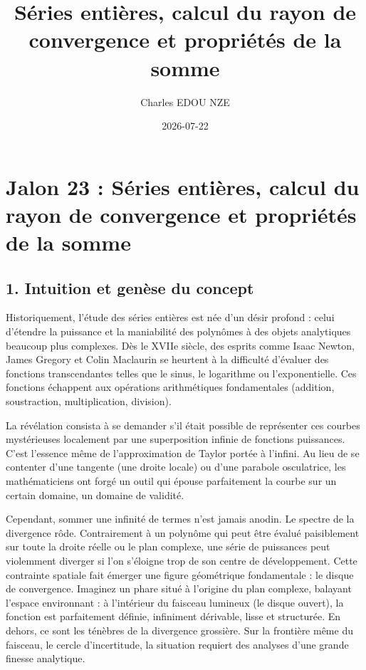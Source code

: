 \documentclass{report}
\title{Séries entières, calcul du rayon de convergence et propriétés de la somme}
\author{Charles EDOU NZE}
\date{2026-07-22}
\begin{document}
\maketitle
\tableofcontents
\newpage

\chapter*{Jalon 23 : Séries entières, calcul du rayon de convergence et propriétés de la somme}

\section*{1. Intuition et genèse du concept}

Historiquement, l'étude des séries entières est née d'un désir profond : celui d'étendre la puissance et la maniabilité des polynômes à des objets analytiques beaucoup plus complexes. Dès le XVIIe siècle, des esprits comme Isaac Newton, James Gregory et Colin Maclaurin se heurtent à la difficulté d'évaluer des fonctions transcendantes telles que le sinus, le logarithme ou l'exponentielle. Ces fonctions échappent aux opérations arithmétiques fondamentales (addition, soustraction, multiplication, division).

La révélation consista à se demander s'il était possible de représenter ces courbes mystérieuses localement par une superposition infinie de fonctions puissances. C'est l'essence même de l'approximation de Taylor portée à l'infini. Au lieu de se contenter d'une tangente (une droite locale) ou d'une parabole osculatrice, les mathématiciens ont forgé un outil qui épouse parfaitement la courbe sur un certain domaine, un domaine de validité.

Cependant, sommer une infinité de termes n'est jamais anodin. Le spectre de la divergence rôde. Contrairement à un polynôme qui peut être évalué paisiblement sur toute la droite réelle ou le plan complexe, une série de puissances peut violemment diverger si l'on s'éloigne trop de son centre de développement. Cette contrainte spatiale fait émerger une figure géométrique fondamentale : le disque de convergence. Imaginez un phare situé à l'origine du plan complexe, balayant l'espace environnant : à l'intérieur du faisceau lumineux (le disque ouvert), la fonction est parfaitement définie, infiniment dérivable, lisse et structurée. En dehors, ce sont les ténèbres de la divergence grossière. Sur la frontière même du faisceau, le cercle d'incertitude, la situation requiert des analyses d'une grande finesse analytique.
\end{document}
